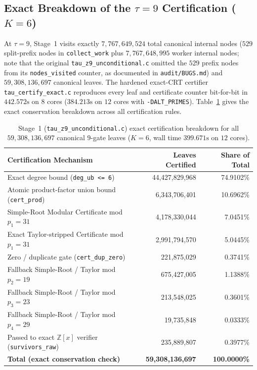 \documentclass[11pt]{article}
\newcommand{\Z}{\mathbb{Z}}
\newcommand{\code}[1]{\texttt{#1}}
\begin{document}
\subsection{Exact Breakdown of the $\tau = 9$ Certification ($K = 6$)}
At $\tau = 9$, Stage~1 visits exactly $7{,}767{,}649{,}524$ total canonical internal nodes ($529$ split-prefix nodes in \code{collect\_work} plus $7{,}767{,}648{,}995$ worker internal nodes; note that the original \code{tau\_z9\_unconditional.c} omitted the $529$ prefix nodes from its \code{nodes\_visited} counter, as documented in \code{audit/BUGS.md}) and $59{,}308{,}136{,}697$ canonical leaves. The hardened exact-CRT certifier \code{tau\_certify\_exact.c} reproduces every leaf and certificate counter bit-for-bit in $442.572\text{s}$ on $8$ cores ($384.213\text{s}$ on $12$ cores with \code{-DALT\_PRIMES}). Table~\ref{tab:stage1} gives the exact conservation breakdown across all certification rules.

\begin{table}[ht]
\centering
\small
\caption{Stage~1 (\code{tau\_z9\_unconditional.c}) exact certification breakdown for all $59{,}308{,}136{,}697$ canonical $9$-gate leaves ($K = 6$, wall time $399.671\text{s}$ on $12$ cores).}
\label{tab:stage1}
\begin{tabular}{@{}lrr@{}}
\toprule
Certification Mechanism & Leaves Certified & Share of Total \\
\midrule
Exact degree bound (\code{deg\_ub <= 6}) & 44,427,829,968 & 74.9102\% \\
Atomic product-factor union bound (\code{cert\_prod}) & 6,343,706,401 & 10.6962\% \\
Simple-Root Modular Certificate mod $p_1 = 31$ & 4,178,330,044 & 7.0451\% \\
Exact Taylor-stripped Certificate mod $p_1 = 31$ & 2,991,794,570 & 5.0445\% \\
Zero / duplicate gate (\code{cert\_dup\_zero}) & 221,875,029 & 0.3741\% \\
Fallback Simple-Root / Taylor mod $p_2 = 19$ & 675,427,005 & 1.1388\% \\
Fallback Simple-Root / Taylor mod $p_3 = 23$ & 213,548,025 & 0.3601\% \\
Fallback Simple-Root / Taylor mod $p_4 = 29$ & 19,735,848 & 0.0333\% \\
Passed to exact $\Z[x]$ verifier (\code{survivors\_raw}) & 235,889,807 & 0.3977\% \\
\midrule
\textbf{Total (exact conservation check)} & \textbf{59,308,136,697} & \textbf{100.0000\%} \\
\bottomrule
\end{tabular}
\end{table}
\end{document}

